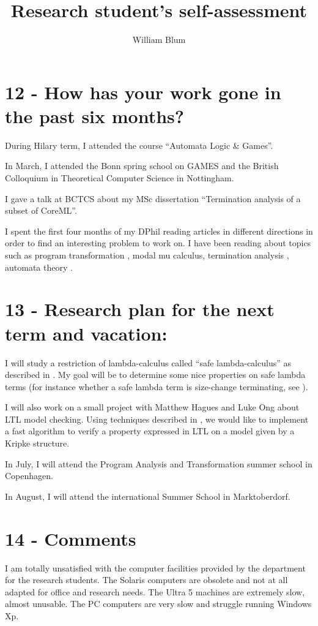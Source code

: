 \documentclass{article}
\author{William Blum}
\title{Research student's self-assessment}
\begin{document}
\maketitle
\section*{12 - How has your work gone in the past six months?}

During Hilary term, I attended the course ``Automata Logic \&
Games''.

In March, I attended the Bonn spring school on GAMES and the British
Colloquium in Theoretical Computer Science in Nottingham.

I gave a talk at BCTCS about my MSc dissertation ``Termination
analysis of a subset of CoreML''.

I spent the first four months of my DPhil reading articles in
different directions in order to find an interesting problem to work
on. I have been reading about topics such as program transformation
\cite{compiler-correct-jones-et-al, interpreter-spec-jones}, modal
mu calculus, termination analysis \cite{podelski-transinvar,
podelski-transpredabsrt, abel-structuralrecanalysis}, automata
theory \cite{alur-vpa}.


\section*{13 - Research plan for the next term and vacation:}

I will study a restriction of lambda-calculus called ``safe
lambda-calculus'' as described in \cite{safety-mirlong2004}. My goal
will be to determine some nice properties on safe lambda terms (for
instance whether a safe lambda term is size-change terminating, see
\cite{jones01,blum-mscthesis}).

I will also work on a small project with Matthew Hagues and Luke Ong
about LTL model checking. Using techniques described in
\cite{DBLP:conf/cav/McMillan03, ckos2005, hammer:truly}, we would
like to implement a fast algorithm to verify a property expressed in
LTL on a model given by a Kripke structure.

In July, I will attend the Program Analysis and Transformation
summer school in Copenhagen.

In August, I will attend the international Summer School in
Marktoberdorf.



\section*{14 - Comments}
I am totally unsatisfied with the computer facilities provided by
the department for the research students. The Solaris computers are
obsolete and not at all adapted for office and research needs. The
Ultra 5 machines are extremely slow, almost unusable. The PC
computers are very slow and struggle running Windows Xp.




\end{document}

